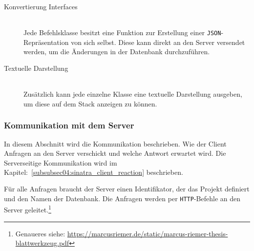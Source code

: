 \begin{description}
\item[Konvertierung Interfaces] \hfill\\
Jede Befehlsklasse besitzt eine Funktion zur Erstellung einer \texttt{JSON}-Repräsentation von sich selbst. Diese kann direkt an den Server versendet werden, um die Änderungen in der Datenbank durchzuführen.

\item[Textuelle Darstellung] \hfill\\
Zusätzlich kann jede einzelne Klasse eine textuelle Darstellung ausgeben, um diese auf dem Stack anzeigen zu können.
\end{description}

\subsubsection{Kommunikation mit dem Server}
\label{subsubsec04:kommunikation_cs}
In diesem Abschnitt wird die Kommunikation beschrieben. Wie der Client Anfragen an den Server verschickt und welche Antwort erwartet wird.
Die Serverseitige Kommunikation wird im Kapitel:~\ref{subsubsec04:sinatra_client_reaction} beschrieben.

Für alle Anfragen braucht der Server einen Identifikator, der das Projekt definiert und den Namen der Datenbank. Die Anfragen werden per \texttt{HTTP}-Befehle an den Server geleitet.\footnote{Genaueres siehe: \url{https://marcusriemer.de/static/marcus-riemer-thesis-blattwerkzeug.pdf}}

